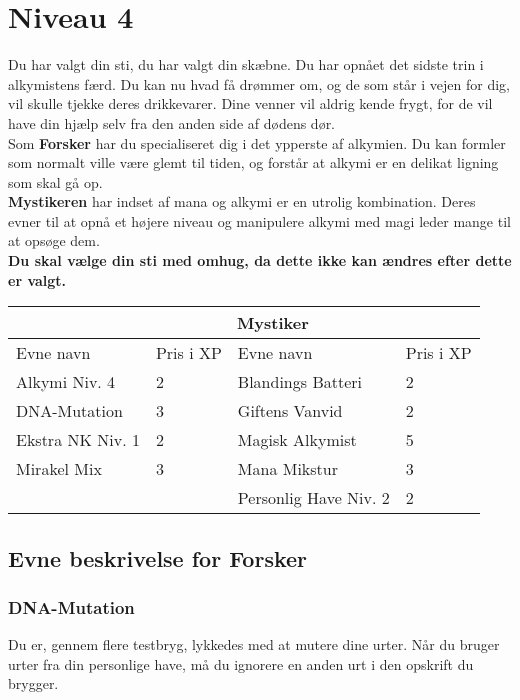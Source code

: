 \chapter*{Niveau 4}
Du har valgt din sti, du har valgt din skæbne. Du har opnået det sidste trin i alkymistens færd. Du kan nu hvad få drømmer om, og de som står i vejen for dig, vil skulle tjekke deres drikkevarer. Dine venner vil aldrig kende frygt, for de vil have din hjælp selv fra den anden side af dødens dør.\\
Som \textbf{Forsker} har du specialiseret dig i det ypperste af alkymien. Du kan formler som normalt ville være glemt til tiden, og forstår at alkymi er en delikat ligning som skal gå op.\\
\textbf{Mystikeren} har indset af mana og alkymi er en utrolig kombination. Deres evner til at opnå et højere niveau og manipulere alkymi med magi leder mange til at opsøge dem.\\

\textbf{Du skal vælge din sti med omhug, da dette ikke kan ændres efter dette er valgt.}\\

\begin{tabular}{|p{}|p{}|p{}|p{}|}
\hline
\rowcolor{cerulean!80}
 \multicolumn{2}{|c|}{  Forsker } & \multicolumn{2}{|c|}{ Mystiker }\\
\hline
\rowcolor{cerulean!40}
    Evne navn & Pris i XP & Evne navn & Pris i XP\\ \hline
    Alkymi Niv. 4 & 2 & Blandings Batteri & 2 \\ \hline
    DNA-Mutation & 3 & Giftens Vanvid & 2\\\hline
    Ekstra NK Niv. 1 & 2 & Magisk Alkymist  & 5\\\hline
    Mirakel Mix & 3 & Mana Mikstur & 3\\\hline
     &  & Personlig Have Niv. 2 & 2\\
\hline
\end{tabular}

\section*{Evne beskrivelse for Forsker}



\subsection*{DNA-Mutation}
Du er, gennem flere testbryg, lykkedes med at mutere dine urter. Når du bruger urter fra din personlige have, må du ignorere en anden urt i den opskrift du brygger.\\

